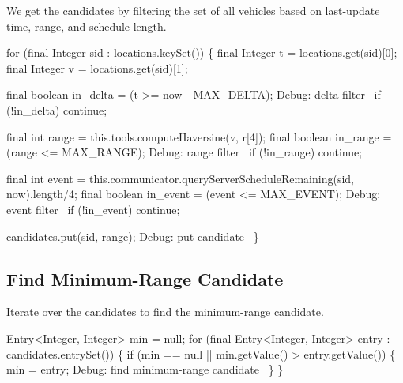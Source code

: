 We get the candidates by filtering the set of all vehicles based on last-update
time, range, and schedule length.

\nwenddocs{}\endmoddef\nwstartdeflinemarkup{}\nwenddeflinemarkup
for (final Integer sid : locations.keySet()) \{
  final Integer t = locations.get(sid)[0];
  final Integer v = locations.get(sid)[1];

  final boolean in_delta = (t >= now - MAX_DELTA);
  \LA{}Debug: delta filter~{\nwtagstyle{}}\RA{}
  if (!in_delta)
    continue;

  final int range = this.tools.computeHaversine(v, r[4]);
  final boolean in_range = (range <= MAX_RANGE);
  \LA{}Debug: range filter~{\nwtagstyle{}}\RA{}
  if (!in_range)
    continue;

  final int event =
    this.communicator.queryServerScheduleRemaining(sid, now).length/4;
  final boolean in_event = (event <= MAX_EVENT);
  \LA{}Debug: event filter~{\nwtagstyle{}}\RA{}
  if (!in_event)
    continue;

  candidates.put(sid, range);
  \LA{}Debug: put candidate~{\nwtagstyle{}}\RA{}
\}
\nwendcode{}\nwdocspar

\subsection{Find Minimum-Range Candidate}

Iterate over the candidates to find the minimum-range candidate.

\nwenddocs{}\endmoddef\nwstartdeflinemarkup{}\nwenddeflinemarkup
Entry<Integer, Integer> min = null;
for (final Entry<Integer, Integer> entry : candidates.entrySet()) \{
  if (min == null || min.getValue() > entry.getValue()) \{
    min = entry;
    \LA{}Debug: find minimum-range candidate~{\nwtagstyle{}}\RA{}
  \}
\}
\nwendcode{}\nwdocspar

